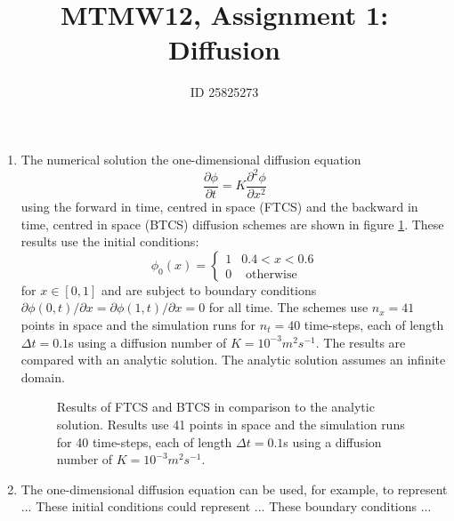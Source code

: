 \documentclass[12pt]{article}
\begin{document}
\thispagestyle{empty}

\title{MTMW12, Assignment 1: Diffusion}
\author{ID 25825273}
\maketitle


\begin{enumerate}

\item The numerical solution the one-dimensional diffusion equation
\begin{equation}
\frac{\partial\phi}{\partial t}=K\frac{\partial^{2}\phi}{\partial x^{2}}
\end{equation}
using the forward in time, centred in space (FTCS) and the backward
in time, centred in space (BTCS) diffusion schemes are shown in figure
\ref{fig:Q1}. These results use the initial conditions: 
\[
\phi_{0}(x)=\begin{cases}
1 & 0.4<x<0.6\\
0 & \text{ otherwise}
\end{cases}
\]
for $x\in[0,1]$ and are subject to boundary conditions $\partial\phi(0,t)/\partial x=\partial\phi(1,t)/\partial x=0$
for all time. The schemes use $n_{x}=41$ points in space and the
simulation runs for $n_{t}=40$ time-steps, each of length $\Delta t=0.1$s
using a diffusion number of $K=10^{-3}m^{2}s^{-1}$. The results are
compared with an analytic solution. The analytic solution assumes
an infinite domain.


\begin{figure}[!tbh]

\caption{Results of FTCS and BTCS in comparison to the analytic solution. Results
use 41 points in space and the simulation runs for 40 time-steps,
each of length $\Delta t=0.1$s using a diffusion number of $K=10^{-3}m^{2}s^{-1}$.
\label{fig:Q1}}
\end{figure}


\item The one-dimensional diffusion equation can be used, for example, to
represent ...
These initial conditions could represent ...
These boundary conditions ...

\end{enumerate}
\end{document}
